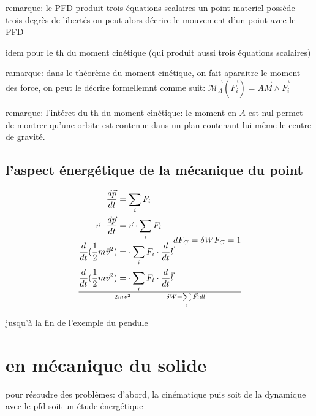 \documentclass[../main.tex]{subfile}
\begin{document}
remarque:
le PFD produit trois équations scalaires
un point materiel possède trois degrès de libertés
on peut alors décrire le mouvement d'un point avec le PFD

idem pour le th du moment cinétique (qui produit aussi trois équations scalaires)

ramarque:
dans le théorème du moment cinétique, on fait aparaitre le moment des force, on peut le décrire formellemnt comme suit:
$\vec{\mathcal{M}_A} (\vec{F_i}) = \vec{AM} \wedge \vec{F_i}$

remarque: l'intéret du th du moment cinétique:
le moment en $A$ est nul
permet de montrer qu'une orbite est contenue dans un plan contenant lui même le centre de gravité.

\subsection{l'aspect énergétique de la mécanique du point}
$$
\begin{aligned}
	\frac{d\vec{p}}{dt} &=\sum\limits_i F_i\\
	\vec{v} \cdot \frac{d\vec{p}}{dt} &= \vec{v} \cdot \sum\limits_i F_i\\
	\frac{d}{dt}(\frac{1}{2} m \vec{v}^2) &= \cdot \sum\limits_i F_i \cdot \frac{d}{dt}\vec{l}\\
	\frac{d}{dt}(\frac{1}{2} m \vec{v}^2) &= \cdot \sum\limits_i F_i \cdot \frac{d}{dt}\vec{l}\\
\end{aligned}
dF_C = \delta W\\
F_C = 1 \over 2 m v^2\\
\delta W = \sum\limits_i \vec{F_i} d\vec{l}
$$


jusqu'à la fin de l'exemple du pendule

\section{en mécanique du solide}
pour résoudre des problèmes:
d'abord, la cinématique
puis soit de la dynamique avec le pfd
soit un étude énergétique
\end{document}
